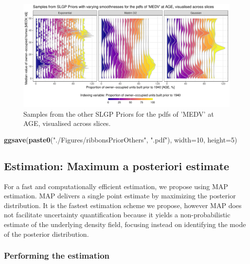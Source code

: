 \documentclass[
]{article}
\newenvironment{Shaded}{\begin{snugshade}}{\end{snugshade}}
\newcommand{\AttributeTok}[1]{\textcolor[rgb]{0.13,0.29,0.53}{#1}}
\newcommand{\DecValTok}[1]{\textcolor[rgb]{0.00,0.00,0.81}{#1}}
\newcommand{\FunctionTok}[1]{\textcolor[rgb]{0.13,0.29,0.53}{\textbf{#1}}}
\newcommand{\NormalTok}[1]{#1}
\newcommand{\StringTok}[1]{\textcolor[rgb]{0.31,0.60,0.02}{#1}}
\begin{document}
\begin{figure}[H]

{\centering \includegraphics{IntroductionSLGP_files/figure-latex/SLGPplottingOtherPrior1-1} 

}

\caption{Samples from the other SLGP Priors for the pdfs of 'MEDV' at AGE, visualised across slices.}\label{fig:SLGPplottingOtherPrior1}
\end{figure}

\begin{Shaded}
\begin{Highlighting}[]
\FunctionTok{ggsave}\NormalTok{(}\FunctionTok{paste0}\NormalTok{(}\StringTok{"./Figures/ribbonsPriorOthers"}\NormalTok{,  }\StringTok{".pdf"}\NormalTok{), }\AttributeTok{width=}\DecValTok{10}\NormalTok{, }\AttributeTok{height=}\DecValTok{5}\NormalTok{)}
\end{Highlighting}
\end{Shaded}

\subsection{Estimation: Maximum a posteriori estimate}\label{estimation-maximum-a-posteriori-estimate}

For a fast and computationally efficient estimation, we propose using MAP estimation. MAP delivers a single point estimate by maximizing the posterior distribution. It is the fastest estimation scheme we propose, however MAP does not facilitate uncertainty quantification because it yields a non-probabilistic estimate of the underlying density field, focusing instead on identifying the mode of the posterior distribution.

\subsubsection{Performing the estimation}\label{performing-the-estimation}
\end{document}
